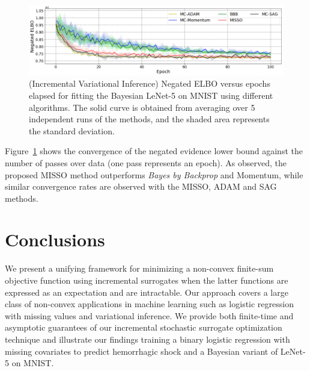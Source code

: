 \documentclass[11pt]{article}
\theoremstyle{t}
\begin{document}
\begin{figure}[H]
  \centering
    \includegraphics[width=\textwidth]{pic_paper/bnn_avg_2.png}\vspace{-.2cm}
  \caption{(Incremental Variational Inference) Negated ELBO versus epochs elapsed for fitting the Bayesian LeNet-5 on MNIST using different algorithms. The solid curve is obtained from averaging over 5 independent runs of the methods, and the shaded area represents the standard deviation.}
  \label{fig:lenetopt}
\end{figure}

Figure~\ref{fig:lenetopt} shows the convergence of the negated evidence lower bound against the number of passes over data (one pass represents an epoch). As observed, the proposed MISSO method outperforms \textit{Bayes by Backprop} and Momentum, while similar convergence rates are observed with the MISSO, ADAM and SAG methods.

\section{Conclusions}
We present a unifying framework for minimizing a non-convex finite-sum objective function using incremental surrogates when the latter functions are expressed as an expectation and are intractable.
Our approach covers a large class of non-convex applications in machine learning such as logistic regression with missing values and variational inference.
We provide both finite-time and asymptotic guarantees of our incremental stochastic surrogate optimization technique and illustrate our findings training a binary logistic regression with missing covariates to predict hemorrhagic shock and a Bayesian variant of LeNet-5 on MNIST.



\newpage



\end{document}
